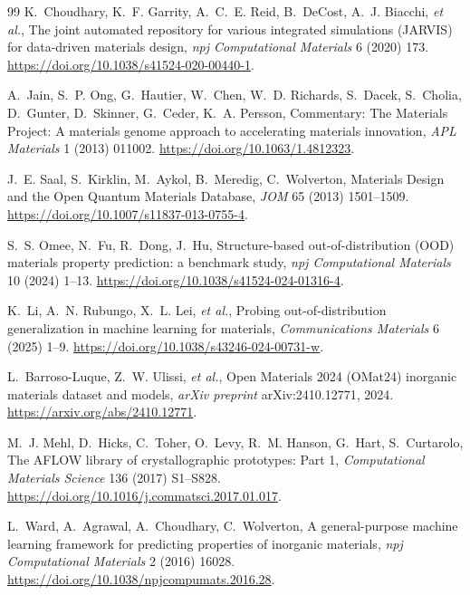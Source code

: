 \documentclass[final,5p,twocolumn,10pt]{elsarticle}
\newcommand{\etal}{\textit{et al.}}
\begin{document}
\begin{thebibliography}{99}
K.~Choudhary, K.~F. Garrity, A.~C.~E. Reid, B.~DeCost, A.~J. Biacchi, \etal,
\newblock The joint automated repository for various integrated simulations ({JARVIS}) for data-driven materials design,
\newblock \textit{npj Computational Materials} 6 (2020) 173.
\newblock \url{https://doi.org/10.1038/s41524-020-00440-1}.

A.~Jain, S.~P. Ong, G.~Hautier, W.~Chen, W.~D. Richards, S.~Dacek, S.~Cholia,
D.~Gunter, D.~Skinner, G.~Ceder, K.~A. Persson,
\newblock Commentary: The Materials Project: A materials genome approach to accelerating materials innovation,
\newblock \textit{APL Materials} 1 (2013) 011002.
\newblock \url{https://doi.org/10.1063/1.4812323}.

J.~E. Saal, S.~Kirklin, M.~Aykol, B.~Meredig, C.~Wolverton,
\newblock Materials Design and the Open Quantum Materials Database,
\newblock \textit{JOM} 65 (2013) 1501--1509.
\newblock \url{https://doi.org/10.1007/s11837-013-0755-4}.

S.~S. Omee, N.~Fu, R.~Dong, J.~Hu,
\newblock Structure-based out-of-distribution ({OOD}) materials property prediction: a benchmark study,
\newblock \textit{npj Computational Materials} 10 (2024) 1--13.
\newblock \url{https://doi.org/10.1038/s41524-024-01316-4}.

K.~Li, A.~N. Rubungo, X.~L. Lei, \etal,
\newblock Probing out-of-distribution generalization in machine learning for materials,
\newblock \textit{Communications Materials} 6 (2025) 1--9.
\newblock \url{https://doi.org/10.1038/s43246-024-00731-w}.

L.~Barroso-Luque, Z.~W. Ulissi, \etal,
\newblock Open Materials 2024 ({OMat24}) inorganic materials dataset and models,
\newblock \textit{arXiv preprint} arXiv:2410.12771, 2024.
\newblock \url{https://arxiv.org/abs/2410.12771}.

M.~J. Mehl, D.~Hicks, C.~Toher, O.~Levy, R.~M. Hanson, G.~Hart, S.~Curtarolo,
\newblock The {AFLOW} library of crystallographic prototypes: Part 1,
\newblock \textit{Computational Materials Science} 136 (2017) S1--S828.
\newblock \url{https://doi.org/10.1016/j.commatsci.2017.01.017}.

L.~Ward, A.~Agrawal, A.~Choudhary, C.~Wolverton,
\newblock A general-purpose machine learning framework for predicting properties of inorganic materials,
\newblock \textit{npj Computational Materials} 2 (2016) 16028.
\newblock \url{https://doi.org/10.1038/npjcompumats.2016.28}.


\end{thebibliography}
\end{document}
